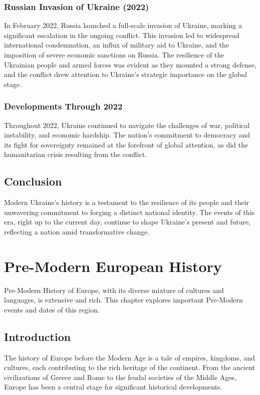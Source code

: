 \documentclass[a4paper,12pt]{book}
\begin{document}
\subsection{Russian Invasion of Ukraine (2022)}
In February 2022, Russia launched a full-scale invasion of Ukraine, marking a significant escalation in the ongoing conflict. This invasion led to widespread international condemnation, an influx of military aid to Ukraine, and the imposition of severe economic sanctions on Russia. The resilience of the Ukrainian people and armed forces was evident as they mounted a strong defense, and the conflict drew attention to Ukraine's strategic importance on the global stage.

\subsection{Developments Through 2022}
Throughout 2022, Ukraine continued to navigate the challenges of war, political instability, and economic hardship. The nation’s commitment to democracy and its fight for sovereignty remained at the forefront of global attention, as did the humanitarian crisis resulting from the conflict.

\section{Conclusion}
\label{sec:conclusion-modern-ukraine}
Modern Ukraine’s history is a testament to the resilience of its people and their unwavering commitment to forging a distinct national identity. The events of this era, right up to the current day, continue to shape Ukraine's present and future, reflecting a nation amid transformative change.

\chapter{Pre-Modern European History}
\label{ch:pre-modern-european-history}

Pre-Modern History of Europe, with its diverse mixture of cultures and languages, is extensive and rich. This chapter explores important Pre-Modern events and dates of this region.

\section{Introduction}
\label{sec:introduction-pre-modern-europe}
The history of Europe before the Modern Age is a tale of empires, kingdoms, and cultures, each contributing to the rich heritage of the continent. From the ancient civilizations of Greece and Rome to the feudal societies of the Middle Ages, Europe has been a central stage for significant historical developments.
\end{document}
